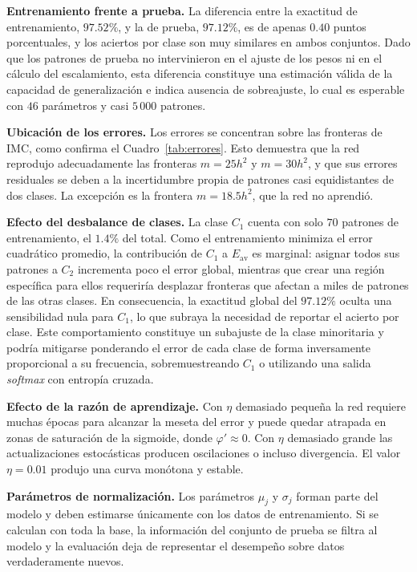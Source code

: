\documentclass[conference]{IEEEtran}
\begin{document}
\textbf{Entrenamiento frente a prueba.} La diferencia entre la exactitud de
entrenamiento, $97.52\%$, y la de prueba, $97.12\%$, es de apenas $0.40$
puntos porcentuales, y los aciertos por clase son muy similares en ambos
conjuntos. Dado que los patrones de prueba no intervinieron en el ajuste de
los pesos ni en el cálculo del escalamiento, esta diferencia constituye una
estimación válida de la capacidad de generalización e indica ausencia de
sobreajuste, lo cual es esperable con $46$ parámetros y casi $5\,000$
patrones.

\textbf{Ubicación de los errores.} Los errores se concentran sobre las
fronteras de IMC, como confirma el Cuadro~\ref{tab:errores}. Esto
demuestra que la red reprodujo adecuadamente las fronteras $m=25h^2$ y
$m=30h^2$, y que sus errores residuales se deben a la incertidumbre propia
de patrones casi equidistantes de dos clases. La excepción es la frontera
$m=18.5h^2$, que la red no aprendió.

\textbf{Efecto del desbalance de clases.} La clase $C_1$ cuenta con solo
$70$ patrones de entrenamiento, el $1.4\%$ del total. Como el entrenamiento
minimiza el error cuadrático promedio, la contribución de $C_1$ a
$E_{\text{av}}$ es marginal: asignar todos sus patrones a $C_2$ incrementa
poco el error global, mientras que crear una región específica para ellos
requeriría desplazar fronteras que afectan a miles de patrones de las
otras clases. En consecuencia, la exactitud global del $97.12\%$ oculta una
sensibilidad nula para $C_1$, lo que subraya la necesidad de reportar el
acierto por clase. Este comportamiento constituye un subajuste de la clase
minoritaria y podría mitigarse ponderando el error de cada clase de forma
inversamente proporcional a su frecuencia, sobremuestreando $C_1$ o
utilizando una salida \textit{softmax} con entropía cruzada.

\textbf{Efecto de la razón de aprendizaje.} Con $\eta$ demasiado pequeña la
red requiere muchas épocas para alcanzar la meseta del error y puede
quedar atrapada en zonas de saturación de la sigmoide, donde
$\varphi'\approx0$. Con $\eta$ demasiado grande las actualizaciones
estocásticas producen oscilaciones o incluso divergencia. El valor
$\eta=0.01$ produjo una curva monótona y estable.

\textbf{Parámetros de normalización.} Los parámetros $\mu_j$ y $\sigma_j$
forman parte del modelo y deben estimarse únicamente con los datos de
entrenamiento. Si se calculan con toda la base, la información del
conjunto de prueba se filtra al modelo y la evaluación deja de representar
el desempeño sobre datos verdaderamente nuevos.
\end{document}
